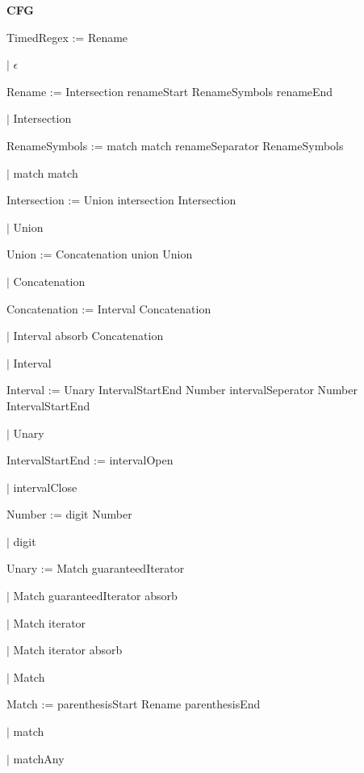 
\textbf{CFG}

TimedRegex := Rename

\qquad	$\mid$ $\epsilon$

Rename := Intersection renameStart RenameSymbols renameEnd

\qquad $\mid$ Intersection

RenameSymbols := match match renameSeparator RenameSymbols

\qquad $\mid$ match match

Intersection := Union intersection Intersection

\qquad $\mid$ Union

Union := Concatenation union Union

\qquad $\mid$ Concatenation

Concatenation := Interval Concatenation

\qquad $\mid$ Interval absorb Concatenation

\qquad $\mid$ Interval

Interval := Unary IntervalStartEnd Number intervalSeperator Number IntervalStartEnd

\qquad $\mid$ Unary

IntervalStartEnd := intervalOpen

\qquad $\mid$ intervalClose

Number := digit Number

\qquad $\mid$ digit

Unary := Match guaranteedIterator

\qquad $\mid$ Match guaranteedIterator absorb

\qquad $\mid$ Match iterator

\qquad $\mid$ Match iterator absorb

\qquad $\mid$ Match

Match := parenthesisStart Rename parenthesisEnd

\qquad $\mid$ match

\qquad $\mid$ matchAny

